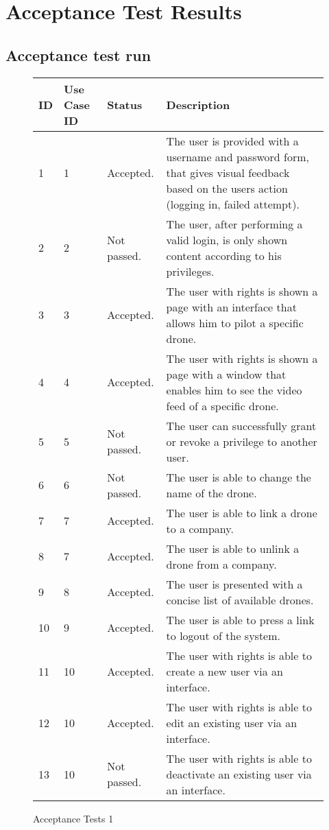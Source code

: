 \chapter{Acceptance Test Results}
\label{appendix:acceptance_test_results}

\section{Acceptance test run}
\begin{figure}[htb]
\begin{center}
\begin{tabular}{ | l | l | l | p{8cm} | }
  \hline
	\textbf{ID} & \textbf{Use Case ID} & \textbf{Status} & \textbf{Description} \\ \hline
	1 & 1 & Accepted. & The user is provided with a username and password form, that gives visual feedback based on the users action (logging in, failed attempt).\\ \hline
	2 & 2 & Not passed. & The user, after performing a valid login, is only shown content according to his privileges. \\ \hline
	3 & 3 & Accepted. & The user with rights is shown a page with an interface that allows him to pilot a specific drone.\\ \hline
	4 & 4 & Accepted. & The user with rights is shown a page with a window that enables him to see the video feed of a specific drone. \\ \hline
	5 & 5 & Not passed. & The user can successfully grant or revoke a privilege to another user. \\ \hline
	6 & 6 & Not passed. & The user is able to change the name of the drone. \\ \hline
	7 & 7 & Accepted. & The user is able to link a drone to a company.\\ \hline
	8 & 7 & Accepted. & The user is able to unlink a drone from a company.  \\ \hline
	9 & 8 & Accepted. & The user is presented with a concise list of available drones.  \\ \hline
	10 & 9 & Accepted. & The user is able to press a link to logout of the system.  \\ \hline
	11 & 10 & Accepted. & The user with rights is able to create a new user via an interface.  \\ \hline
	12 & 10 & Accepted. & The user with rights is able to edit an existing user via an interface.  \\ \hline
	13 & 10 & Not passed. & The user with rights is able to deactivate an existing user via an interface.  \\

  \hline
\end{tabular}
\caption{Acceptance Tests 1}
\label{tab:acceptance_tests1_results}
\end{center}
\end{figure}

